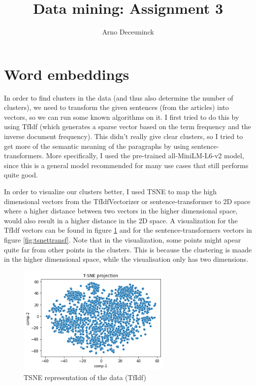 \documentclass{article}
\title{Data mining: Assignment 3}
\author{Arno Deceuninck}
\begin{document}
\maketitle

\section{Word embeddings}
In order to find clusters in the data (and thus also determine the number of clusters), we need to transform the given sentences (from the articles) into vectors, so we can run some known algorithms on it. I first tried to do this by using TfIdf (which generates a sparse vector based on the term frequency and the inverse document frequency). This didn't really give clear clusters, so I tried to get more of the semantic meaning of the paragraphs by using sentence-transformers. More specifically, I used the pre-trained all-MiniLM-L6-v2 model, since this is a general model recommended for many use cases that still performs quite good.

In order to visualize our clusters better, I used TSNE to map the high dimensional vectors from the TfIdfVectorizer or sentence-transformer to 2D space where a higher distance between two vectors in the higher dimensional space, would also result in a higher distance in the 2D space. A visualization for the TfIdf vectors can be found in figure \ref{fig:tsnetfidf} and for the sentence-transformers vectors in figure \ref{fig:tsnettransf}. Note that in the visualization, some points might apear quite far from other points in the clusters. This is because the clustering is maade in the higher dimensional space, while the visualisation only has two dimensions.


\begin{figure}[h!]
\centering
\includegraphics[width=75mm]{tsne-tfidf.png}
\caption{TSNE representation of the data (TfIdf)}
\label{fig:tsnetfidf}
\end{figure}
\end{document}
